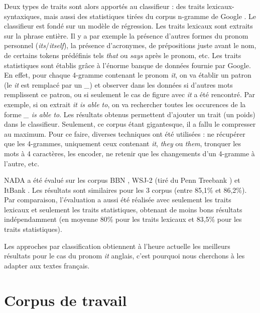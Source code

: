 \documentclass[a4paper,12pt]{article}
\begin{document}
Deux types de traits sont alors apportés au classifieur : des traits lexicaux-syntaxiques, mais aussi des statistiques tirées du corpus n-gramme de Google \citep{google-ngram}. Le classifieur est fondé sur un modèle de régression. Les traits lexicaux sont extraits sur la phrase entière. Il y a par exemple la présence d'autres formes du pronom personnel (\textit{its}/\textit{itself}), la présence d'acronymes, de prépositions juste avant le nom, de certains tokens prédéfinis tels \og{}\textit{that}\fg{} ou \og{}\textit{says}\fg{} après le pronom, etc.
Les traits statistiques sont établis grâce à l'énorme banque de données fournie par Google. En effet, pour chaque 4-gramme contenant le pronom \og{}\textit{it}\fg{}, on va établir un patron (le \og{}\textit{it}\fg{} est remplacé par un \og{}\textit{\_}\fg{}) et observer dans les données si d'autres mots remplissent ce patron, ou si seulement le cas de figure avec \og{}\textit{it}\fg{} a été rencontré. Par exemple, si on extrait \og{}\textit{it is able to}\fg{}, on va rechercher toutes les occurences de la forme \og{}\textit{\_ is able to}\fg{}.
Les résultats obtenus permettent d'ajouter un trait (un poids) dans le classifieur.
Seulement, ce corpus étant gigantesque, il a fallu le compresser au maximum. Pour ce faire, diverses techniques ont été utilisées : ne récupérer que les 4-grammes, uniquement ceux contenant \og{}\textit{it}\fg{}, \og{}\textit{they}\fg{} ou \og{}\textit{them}\fg{}, tronquer les mots à 4 caractères, les encoder, ne retenir que les changements d'un 4-gramme à l'autre, etc.

NADA a été évalué sur les corpus BBN \cite{BBN}, WSJ-2 (tiré du Penn Treebank \cite{Marcus-1993-BLA-972470.972475}) et ItBank \cite{Bergsma08distributionalidentification}. Les résultats sont similaires pour les 3 corpus (entre 85,1\% et 86,2\%). Par comparaison, l'évaluation a aussi été réalisée avec seulement les traits lexicaux et seulement les traits statistiques, obtenant de moins bons résultats indépendamment (en moyenne 80\% pour les traits lexicaux et 83,5\% pour les traits statistiques).

Les approches par classification obtiennent à l'heure actuelle les meilleurs résultats pour le cas du pronom \og \textit{it} \fg{} anglais, c'est pourquoi nous cherchons à les adapter aux textes français.

\section{Corpus de travail}
\label{corpus}
\end{document}
